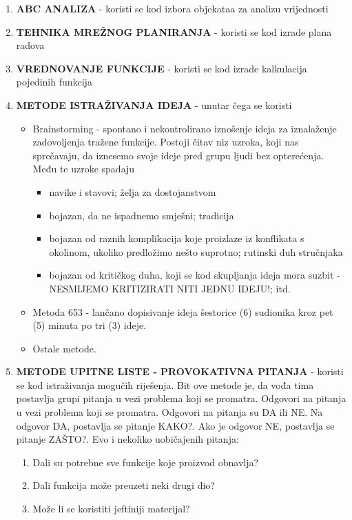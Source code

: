 \documentclass[a4paper,12pt]{article}
\numberwithin{figure}{section}
\begin{document}
\begin{enumerate}
\item \textbf{ABC ANALIZA} - koristi se kod izbora objekataa za analizu vrijednosti
\item \textbf{TEHNIKA MREŽNOG PLANIRANJA} - koristi se kod izrade plana radova
\item \textbf{VREDNOVANJE FUNKCIJE} - koristi se kod izrade kalkulacija pojedinih funkcija
\item \textbf{METODE ISTRAŽIVANJA IDEJA} - unutar čega se koristi
\begin{itemize}
\item Brainstorming - spontano i nekontrolirano iznošenje ideja za iznalaženje zadovoljenja tražene funkcije. Postoji čitav niz uzroka, koji nas sprečavaju, da iznesemo svoje ideje pred grupu ljudi bez opterećenja. Među te uzroke spadaju 
\begin{itemize}
\item navike i stavovi; želja za dostojanstvom
\item bojazan, da ne ispadnemo smješni; tradicija
\item bojazan od raznih komplikacija koje proizlaze iz konflikata s okolinom, ukoliko predložimo nešto suprotno; rutinski duh stručnjaka
\item bojazan od kritičkog duha, koji se kod skupljanja ideja mora suzbit - NESMIJEMO KRITIZIRATI NITI JEDNU IDEJU!; itd.
\end{itemize}  
\item Metoda 653 - lančano dopisivanje ideja šestorice (6) sudionika kroz pet (5) minuta po tri (3) ideje.
\item Ostale metode. 
\end{itemize}
\item \textbf{METODE UPITNE LISTE - PROVOKATIVNA PITANJA} - koristi se kod istraživanja mogučih riješenja. Bit ove metode je, da vođa tima postavlja grupi pitanja u vezi problema koji se promatra. Odgovori na pitanja u vezi problema koji se promatra. Odgovori na pitanja su DA ili NE. Na odgovor DA, postavlja se pitanje KAKO?.  Ako je odgovor NE, postavlja se pitanje ZAŠTO?. Evo i nekoliko uobičajenih pitanja:
\begin{center}
\begin{enumerate}
\item Dali su potrebne sve funkcije koje proizvod obnavlja?
\item Dali funkcija može preuzeti neki drugi dio?
\item Može li se koristiti jeftiniji materijal?

\end{enumerate}
\end{center}
\end{enumerate}
\end{document}
